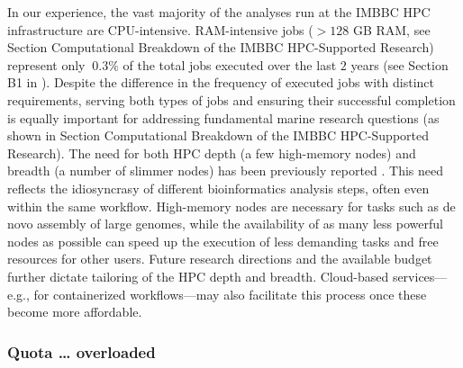    In our experience, the vast majority of the analyses run at the IMBBC HPC infrastructure are CPU-intensive. 
   RAM-intensive jobs ($>128$ GB RAM, see Section Computational Breakdown of the IMBBC HPC-Supported Research) represent only $~0.3\%$ of the total jobs executed over the last $2$ years (see Section B1 in \citep{haris_zafeiropoulos_2021_4665308}). 
   Despite the difference in the frequency of executed jobs with distinct requirements, serving both types of jobs and ensuring their successful completion is equally important for addressing fundamental marine research questions (as shown in Section Computational Breakdown of the IMBBC HPC-Supported Research). 
   The need for both HPC depth (a few high-memory nodes) and breadth (a number of slimmer nodes) has been previously reported \citep{lampa2013lessons}. 
   This need reflects the idiosyncrasy of different bioinformatics analysis steps, often even within the same workflow. 
   High-memory nodes are necessary for tasks such as de novo assembly of large genomes, while the availability of as many less powerful nodes as possible can speed up the execution of less demanding tasks and free resources for other users. 
   Future research directions and the available budget further dictate tailoring of the HPC depth and breadth. Cloud-based services—e.g., for containerized workflows—may also facilitate this process once these become more affordable.

   \subsubsection*{Quota … overloaded}

